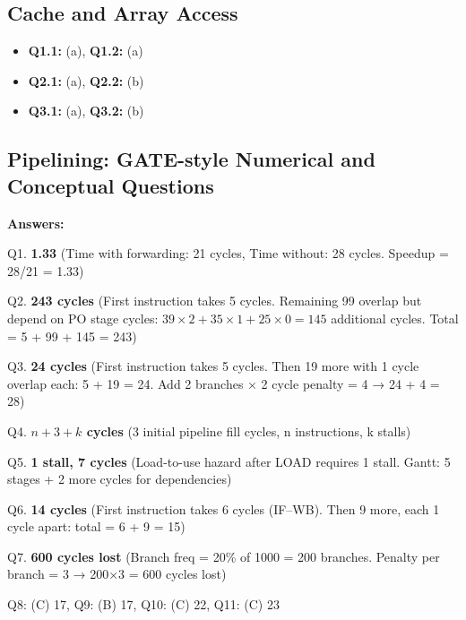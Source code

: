 \subsection*{Cache and Array Access}
\begin{itemize}
    \item \textbf{Q1.1:} (a), \quad \textbf{Q1.2:} (a)
    \item \textbf{Q2.1:} (a), \quad \textbf{Q2.2:} (b)
    \item \textbf{Q3.1:} (a), \quad \textbf{Q3.2:} (b)
\end{itemize}

\subsection*{Pipelining: GATE-style Numerical and Conceptual Questions}
\noindent \textbf{Answers:}

Q1. \textbf{1.33} \hfill (Time with forwarding: 21 cycles, Time without: 28 cycles. Speedup = 28/21 = 1.33)

Q2. \textbf{243 cycles} \hfill (First instruction takes 5 cycles. Remaining 99 overlap but depend on PO stage cycles: $39\times2 + 35\times1 + 25\times0 = 145$ additional cycles. Total = 5 + 99 + 145 = 243)

Q3. \textbf{24 cycles} \hfill (First instruction takes 5 cycles. Then 19 more with 1 cycle overlap each: 5 + 19 = 24. Add 2 branches × 2 cycle penalty = 4 → 24 + 4 = 28)

Q4. \textbf{$n + 3 + k$ cycles} \hfill (3 initial pipeline fill cycles, n instructions, k stalls)

Q5. \textbf{1 stall, 7 cycles} \hfill (Load-to-use hazard after LOAD requires 1 stall. Gantt: 5 stages + 2 more cycles for dependencies)

Q6. \textbf{14 cycles} \hfill (First instruction takes 6 cycles (IF–WB). Then 9 more, each 1 cycle apart: total = 6 + 9 = 15)

Q7. \textbf{600 cycles lost} \hfill (Branch freq = 20\% of 1000 = 200 branches. Penalty per branch = 3 → 200×3 = 600 cycles lost)

Q8: (C) 17, Q9: (B) 17, Q10: (C) 22, Q11: (C) 23